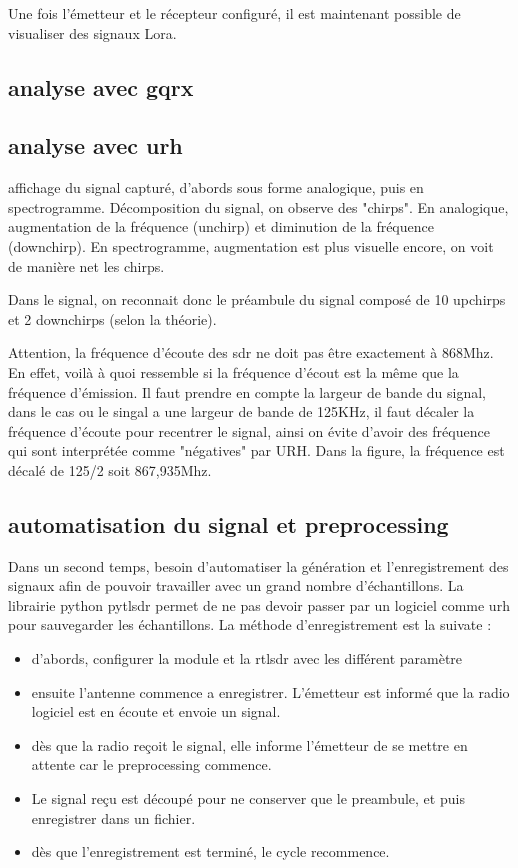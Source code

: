 Une fois l'émetteur et le récepteur configuré, il est maintenant possible de visualiser des signaux Lora.

\subsection{analyse avec gqrx}



\subsection{analyse avec urh}

affichage du signal capturé, d'abords sous forme analogique, puis en spectrogramme.
Décomposition du signal, on observe des "chirps". En analogique, augmentation de la fréquence (unchirp) et diminution de la fréquence (downchirp). En spectrogramme, augmentation est plus visuelle encore, on voit de manière net les chirps.

Dans le signal, on reconnait donc le préambule du signal composé de 10 upchirps et 2 downchirps (selon la théorie).

Attention, la fréquence d'écoute des sdr ne doit pas être exactement à 868Mhz. En effet, voilà à quoi ressemble si la fréquence d'écout est la même que la fréquence d'émission. Il faut prendre en compte la largeur de bande du signal, dans le cas ou le singal a une largeur de bande de 125KHz, il faut décaler la fréquence d'écoute pour recentrer le signal, ainsi on évite d'avoir des fréquence qui sont interprétée comme "négatives" par URH. Dans la figure, la fréquence est décalé de 125/2 soit 867,935Mhz.

\subsection{automatisation du signal et preprocessing}

Dans un second temps, besoin d'automatiser la génération et l'enregistrement des signaux afin de pouvoir travailler avec un grand nombre d'échantillons. La librairie python pytlsdr permet de ne pas devoir passer par un logiciel comme urh pour sauvegarder les échantillons. La méthode d'enregistrement est la suivate :

\begin{itemize}
\item d'abords, configurer la module et la rtlsdr avec les différent paramètre
\item ensuite l'antenne commence a enregistrer. L'émetteur est informé que la radio logiciel est en écoute et envoie un signal. 
\item dès que la radio reçoit le signal, elle informe l'émetteur de se mettre en attente car le preprocessing commence.
\item Le signal reçu est découpé pour ne conserver que le preambule, et puis enregistrer dans un fichier.
\item dès que l'enregistrement est terminé, le cycle recommence.
\end{itemize}

